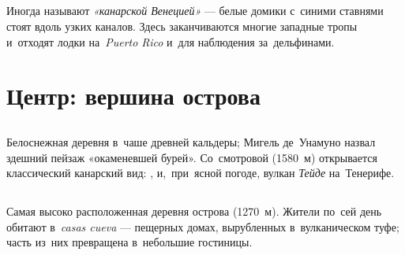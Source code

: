 \subsection*{}

Иногда называют \textit{«канарской Венецией»} --- белые домики
с~синими ставнями стоят вдоль узких каналов. Здесь заканчиваются
многие западные тропы и~отходят лодки на~\textit{Puerto Rico}
и~для наблюдения за~дельфинами.

\section{Центр: вершина острова}

\subsection*{}


Белоснежная деревня в~чаше древней кальдеры; Мигель де~Унамуно
назвал здешний пейзаж «окаменевшей бурей».
Со~смотровой  (1580~м) открывается классический
канарский вид: , 
и,~при~ясной погоде, вулкан \textit{Тейде} на~Тенерифе.

\subsection*{}

Самая высоко расположенная деревня острова (1270~м). Жители по~сей
день обитают в~\textit{casas cueva} --- пещерных домах, вырубленных
в~вулканическом туфе; часть из~них превращена в~небольшие
гостиницы.
